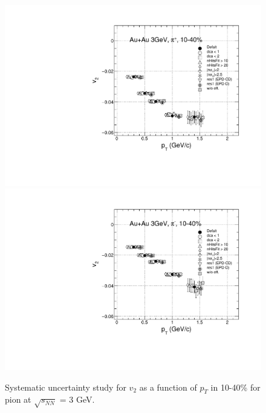 \begin{figure}[h]
\includegraphics[scale=0.4]{chapter3/fig/sys/pion/v2pt_pip_sys.pdf}
\includegraphics[scale=0.4]{chapter3/fig/sys/pion/v2pt_pim_sys.pdf}
\caption{Systematic uncertainty study for $v_{2}$ as a function of $p_{T}$ in 10-40\% for pion at $\sqrt{s_{NN}}$ = 3 GeV.}
\label{pion_v1y_sys}
\end{figure}


